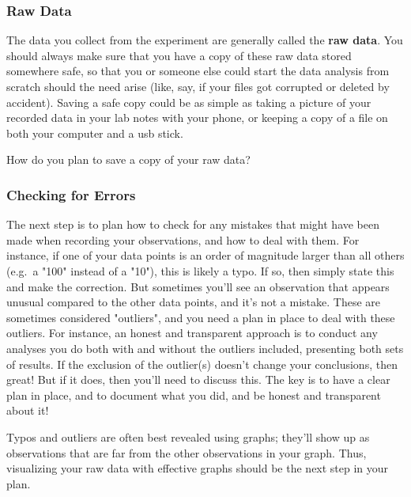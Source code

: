 \documentclass[
]{book}
\begin{document}
\hypertarget{raw-data}{%
\subsubsection*{Raw Data}\label{raw-data}}

The data you collect from the experiment are generally called the \textbf{raw data}. You should always make sure that you have a copy of these raw data stored somewhere safe, so that you or someone else could start the data analysis from scratch should the need arise (like, say, if your files got corrupted or deleted by accident). Saving a safe copy could be as simple as taking a picture of your recorded data in your lab notes with your phone, or keeping a copy of a file on both your computer and a usb stick.

How do you plan to save a copy of your raw data?

\hypertarget{checking-for-errors}{%
\subsubsection*{Checking for Errors}\label{checking-for-errors}}

The next step is to plan how to check for any mistakes that might have been made when recording your observations, and how to deal with them. For instance, if one of your data points is an order of magnitude larger than all others (e.g.~a "100" instead of a "10"), this is likely a typo. If so, then simply state this and make the correction. But sometimes you'll see an observation that appears unusual compared to the other data points, and it's not a mistake. These are sometimes considered "outliers", and you need a plan in place to deal with these outliers. For instance, an honest and transparent approach is to conduct any analyses you do both with and without the outliers included, presenting both sets of results. If the exclusion of the outlier(s) doesn't change your conclusions, then great! But if it does, then you'll need to discuss this. The key is to have a clear plan in place, and to document what you did, and be honest and transparent about it!

Typos and outliers are often best revealed using graphs; they'll show up as observations that are far from the other observations in your graph. Thus, visualizing your raw data with effective graphs should be the next step in your plan.
\end{document}
